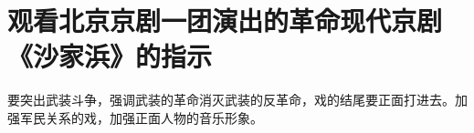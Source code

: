 \section[观看北京京剧一团演出的革命现代京剧《沙家浜》的指示（一九六四年七月）]{观看北京京剧一团演出的革命现代京剧《沙家浜》的指示}


要突出武装斗争，强调武装的革命消灭武装的反革命，戏的结尾要正面打进去。加强军民关系的戏，加强正面人物的音乐形象。

